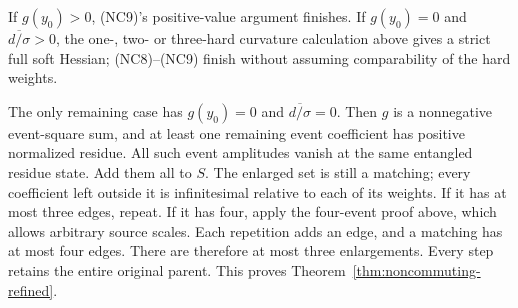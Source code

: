 If $g(y_0)>0$, (NC9)'s positive-value argument finishes. If $g(y_0)=0$
and $\overline{d/\sigma}>0$, the one-, two- or three-hard curvature
calculation above gives a strict full soft Hessian; (NC8)--(NC9)
finish without assuming comparability of the hard weights.

The only remaining case has $g(y_0)=0$ and
$\overline{d/\sigma}=0$. Then $g$ is a nonnegative event-square
sum, and at least one remaining event coefficient has positive
normalized residue. All such event amplitudes vanish at the same
entangled residue state. Add them all to $S$. The enlarged set is
still a matching; every coefficient left outside it is infinitesimal
relative to each of its weights. If it has at most three edges, repeat.
If it has four, apply the four-event proof above, which allows arbitrary source scales.
Each repetition adds an edge, and a matching has at most four edges.
There are therefore at most three enlargements. Every step retains
the entire original parent. This proves
Theorem~\ref{thm:noncommuting-refined}.

